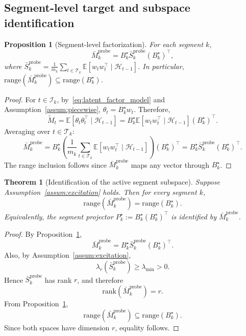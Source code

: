 \documentclass[12pt]{article}
\newcommand{\E}{\mathbb{E}}
\newcommand{\cH}{\mathcal{H}}
\newcommand{\cT}{\mathcal{T}}
\newcommand{\cI}{\mathcal{I}}
\newcommand{\rank}{\mathrm{rank}}
\newcommand{\range}{\mathrm{range}}
\newtheorem{theorem}{Theorem}
\newtheorem{proposition}{Proposition}
\theoremstyle{plain}
\theoremstyle{definition}
\begin{document}
\subsection{Segment-level target and subspace identification}

\begin{proposition}[Segment-level factorization]
\label{prop:segment_factorization}
For each segment $k$,
\begin{equation}
\bar{M}_k^{\mathrm{probe}} = B_k^\star \bar{S}_k^{\mathrm{probe}} (B_k^\star)^\top,
\label{eq:segment_factorization}
\end{equation}
where $\bar{S}_k^{\mathrm{probe}} = \frac{1}{m_k}\sum_{t \in \cT_k} \E[w_t w_t^\top \mid \cH_{t-1}]$. In particular, $\range(\bar{M}_k^{\mathrm{probe}}) \subseteq \range(B_k^\star)$.
\end{proposition}

\begin{proof}
For $t \in \cI_k$, by~\eqref{eq:latent_factor_model} and Assumption~\ref{assum:piecewise}, $\theta_t = B_k^\star w_t$. Therefore,
\[
\widetilde{M}_t = \E[\theta_t \theta_t^\top \mid \cH_{t-1}] = B_k^\star \E[w_t w_t^\top \mid \cH_{t-1}] (B_k^\star)^\top.
\]
Averaging over $t \in \cT_k$:
\[
\bar{M}_k^{\mathrm{probe}}
= B_k^\star \!\left(\frac{1}{m_k}\sum_{t \in \cT_k} \E[w_t w_t^\top \mid \cH_{t-1}]\right)(B_k^\star)^\top
= B_k^\star \bar{S}_k^{\mathrm{probe}} (B_k^\star)^\top.
\]
The range inclusion follows since $\bar{M}_k^{\mathrm{probe}}$ maps any vector through $B_k^\star$.
\end{proof}

\begin{theorem}[Identification of the active segment subspace]
\label{prop:subspace_identification}
Suppose Assumption~\ref{assum:excitation} holds. Then for every segment $k$,
\begin{equation}
\range(\bar{M}_k^{\mathrm{probe}}) = \range(B_k^\star).
\label{eq:subspace_id}
\end{equation}
Equivalently, the segment projector $P_k^\star := B_k^\star (B_k^\star)^\top$ is identified by $\bar{M}_k^{\mathrm{probe}}$.
\end{theorem}

\begin{proof}
By Proposition~\ref{prop:segment_factorization},
\[
\bar{M}_k^{\mathrm{probe}}
=
B_k^\star \bar{S}_k^{\mathrm{probe}} (B_k^\star)^\top.
\]
Also, by Assumption~\ref{assum:excitation},
\[
\lambda_r(\bar{S}_k^{\mathrm{probe}}) \ge \lambda_{\min} > 0.
\]
Hence $\bar{S}_k^{\mathrm{probe}}$ has rank $r$, and therefore
\[
\rank(\bar{M}_k^{\mathrm{probe}})=r.
\]
From Proposition~\ref{prop:segment_factorization},
\[
\range(\bar{M}_k^{\mathrm{probe}})
\subseteq
\range(B_k^\star).
\]
Since both spaces have dimension $r$, equality follows.
\end{proof}
\end{document}
